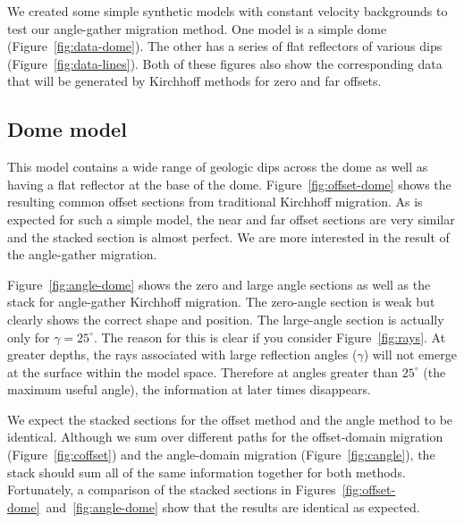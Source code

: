 
We created some simple synthetic models with constant velocity backgrounds
to test our angle-gather migration method.  One model is a simple dome 
(Figure~\ref{fig:data-dome}).  The other has a series of flat reflectors of 
various dips (Figure~\ref{fig:data-lines}).  Both of these figures also
show the corresponding data that will be generated by Kirchhoff methods
for zero and far offsets.



\par
\subsection{Dome model}

This model contains a wide range of geologic dips across the dome as well
as having a flat reflector at the base of the dome.  
Figure~\ref{fig:offset-dome} shows the resulting common offset sections from
traditional Kirchhoff migration.  As is expected for such a simple model,
the near and far offset sections are very similar and the stacked section
is almost perfect.  We are more interested in the result of the angle-gather
migration.

Figure~\ref{fig:angle-dome} shows the zero and large angle sections as well
as the stack for angle-gather Kirchhoff migration.  The zero-angle section
is weak but clearly shows the correct shape and position.  The large-angle
section is actually only for $\gamma=25^{\circ}$. 
The reason for this is clear if you consider Figure~\ref{fig:rays}.  At 
greater depths, the rays associated with large reflection angles ($\gamma$)
will not emerge at the surface within the model space.  Therefore at angles
greater than $25^{\circ}$ (the maximum useful angle), the information at later 
times disappears.  

We expect the stacked sections for the offset method and the angle method 
to be identical.  Although we sum over different paths for the offset-domain 
migration (Figure~\ref{fig:coffset}) and the angle-domain migration 
(Figure~\ref{fig:cangle}), the stack should sum all of the same information
together for both methods.  Fortunately, a comparison of the stacked sections
in Figures~\ref{fig:offset-dome}~and~\ref{fig:angle-dome} show that the
results are identical as expected.
 
